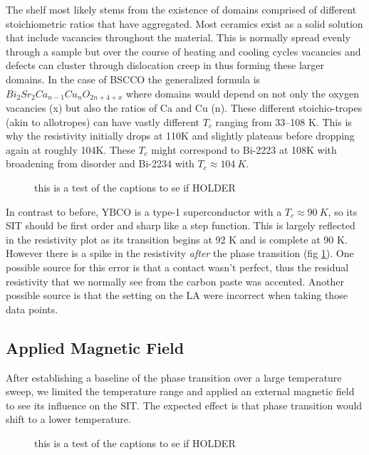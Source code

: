 \documentclass[
reprint,
amsmath,amssymb,
aps,
tikz,
border=5pt
]{revtex4-1}
\begin{document}
    The shelf most likely stems from the existence of domains comprised of different stoichiometric ratios that have aggregated. Most ceramics exist as a solid solution that include vacancies throughout the material. This is normally spread evenly through a sample but over the course of heating and cooling cycles vacancies and defects can cluster through dislocation creep in thus forming these larger domains. In the case of BSCCO the generalized formula is $Bi_2Sr_2Ca_{n-1}Cu_nO_{2n+4+x}$ where domains would depend on not only the oxygen vacancies (x) but also the ratios of Ca and Cu (n). These different stoichio-tropes (akin to allotropes) can have vastly different $T_c$ ranging from 33--108 K. This is why the resistivity initially drops at 110K and slightly plateaus before dropping again at roughly 104K. These $T_c$ might correspond to Bi-2223 at 108K with broadening from disorder and Bi-2234 with $T_c \approx 104~K$.
    
    
  
    \begin{figure}[t]
      \resizebox{0.45\textwidth}{!}{}
        \caption{this is a test of the captions to se if  HOLDER}
        \label{fig:ybco_temp}
    \end{figure}

    In contrast to before, YBCO is a type-1 superconductor with a $T_c \approx 90~K$, so its SIT should be first order and sharp like a step function. This is largely reflected in the resistivity plot as its transition begins at 92 K and is complete at 90 K. However there is a spike in the resistivity \textit{after} the phase transition (fig \ref{fig:ybco_temp}). One possible source for this error is that a contact wasn't perfect, thus the residual resistivity that we normally see from the carbon paste was accented. Another possible source is that the setting on the LA were incorrect when taking those data points. 


  \subsection*{Applied Magnetic Field}

    After establishing a baseline of the phase transition over a large temperature sweep, we limited the temperature range and applied an external magnetic field  to see its influence on the SIT. The expected effect is that phase transition would shift to a lower temperature. 

    \begin{figure}[t]
      \resizebox{0.45\textwidth}{!}{}
        \caption{this is a test of the captions to se if  HOLDER}
        \label{fig:bscco_mag}
    \end{figure}
\end{document}
